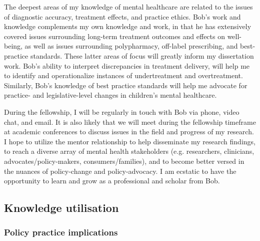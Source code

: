 \documentclass[twocolumn, serif, rga, authordate]{jote-article}
\begin{document}
The deepest areas of my knowledge of mental healthcare are related to
the issues of diagnostic accuracy, treatment effects, and practice
ethics. Bob's work and knowledge complements my own knowledge and work,
in that he has extensively covered issues surrounding long-term
treatment outcomes and effects on well-being, as well as issues
surrounding polypharmacy, off-label prescribing, and best-practice
standards. These latter areas of focus will greatly inform my
dissertation work. Bob's ability to interpret discrepancies in treatment
delivery, will help me to identify and operationalize instances of
undertreatment and overtreatment. Similarly, Bob's knowledge of best
practice standards will help me advocate for practice- and
legislative-level changes in children's mental healthcare.

During the fellowship, I will be regularly in touch with Bob via phone,
video chat, and email. It is also likely that we will meet during the
fellowship timeframe at academic conferences to discuss issues in the
field and progress of my research. I hope to utilize the mentor
relationship to help disseminate my research findings, to reach a
diverse array of mental health stakeholders (e.g. researchers,
clinicians, advocates/policy-makers, consumers/families), and to become
better versed in the nuances of policy-change and policy-advocacy. I am
ecstatic to have the opportunity to learn and grow as a professional and
scholar from Bob.


\subsection*{Knowledge utilisation}



\subsubsection*{Policy practice implications}
\end{document}
